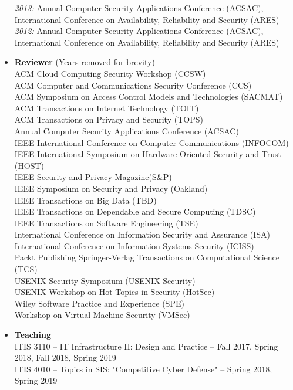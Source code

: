\documentclass[10pt]{article}
\begin{document}
\begin{itemize}
    \textit{2013:} Annual Computer Security Applications Conference (ACSAC), International Conference on Availability, Reliability and Security (ARES)\\
    \textit{2012:} Annual Computer Security Applications Conference (ACSAC), International Conference on Availability, Reliability and Security (ARES)\\
  \item \textbf{Reviewer} (Years removed for brevity)\\
  ACM Cloud Computing Security Workshop (CCSW)\\
  ACM Computer and Communications Security Conference (CCS)\\
  ACM Symposium on Access Control Models and Technologies (SACMAT)\\
  ACM Transactions on Internet Technology (TOIT)\\
  ACM Transactions on Privacy and Security (TOPS)\\
  Annual Computer Security Applications Conference (ACSAC)\\
  IEEE International Conference on Computer Communications (INFOCOM)\\
  IEEE International Symposium on Hardware Oriented Security and Trust (HOST)\\
  IEEE Security and Privacy Magazine(S\&P)\\
  IEEE Symposium on Security and Privacy (Oakland)\\
  IEEE Transactions on Big Data (TBD)\\
  IEEE Transactions on Dependable and Secure Computing (TDSC)\\
  IEEE Transactions on Software Engineering (TSE)\\
  International Conference on Information Security and Assurance (ISA)\\
  International Conference on Information Systems Security (ICISS)\\
  Packt Publishing
  Springer-Verlag Transactions on Computational Science (TCS)\\
  USENIX Security Symposium (USENIX Security)\\
  USENIX Workshop on Hot Topics in Security (HotSec)\\
  Wiley Software Practice and Experience (SPE)\\
  Workshop on Virtual Machine Security (VMSec)
  \item \textbf{Teaching}\\
  ITIS 3110 -- IT Infrastructure II: Design and Practice -- Fall 2017, Spring 2018, Fall 2018, Spring 2019\\
  ITIS 4010 -- Topics in SIS: "Competitive Cyber Defense" -- Spring 2018, Spring 2019
\end{itemize}
\end{document}
